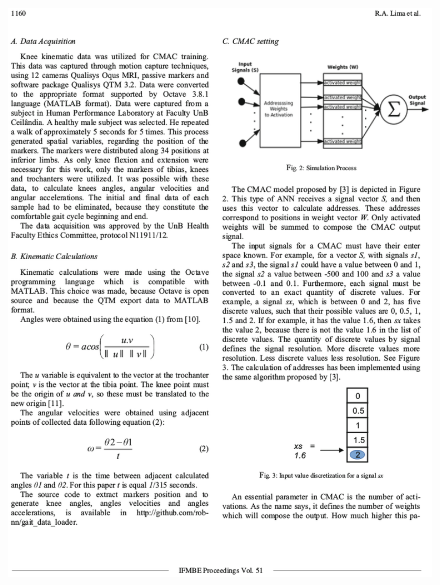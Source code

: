 \begin{apendicesenv}
\begin{figure}[ht]
		\includegraphics[width=17cm]{figuras/wc201502.eps}
	\label{wc201502}
	\end{figure}
	\begin{figure}[ht]
		\centering

\end{figure}
\end{apendicesenv}
